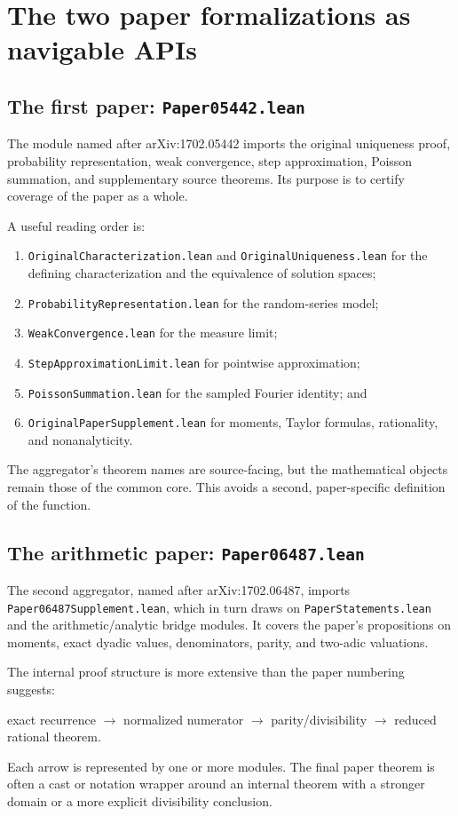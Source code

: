 \documentclass[11pt,oneside]{article}
\theoremstyle{definition}
\theoremstyle{remark}
\begin{document}
\section{The two paper formalizations as navigable APIs}\label{ch:papers}

\subsection{The first paper: \texttt{Paper05442.lean}}
The module named after arXiv:1702.05442 imports the original uniqueness proof, probability representation, weak convergence, step approximation, Poisson summation, and supplementary source theorems.  Its purpose is to certify coverage of the paper as a whole.

A useful reading order is:
\begin{enumerate}
  \item \nolinkurl{OriginalCharacterization.lean} and \nolinkurl{OriginalUniqueness.lean}
    for the defining characterization and the equivalence of solution spaces;
  \item \nolinkurl{ProbabilityRepresentation.lean} for the random-series model;
  \item \nolinkurl{WeakConvergence.lean} for the measure limit;
  \item \nolinkurl{StepApproximationLimit.lean} for pointwise approximation;
  \item \nolinkurl{PoissonSummation.lean} for the sampled Fourier identity; and
  \item \nolinkurl{OriginalPaperSupplement.lean} for moments, Taylor formulas, rationality, and nonanalyticity.
\end{enumerate}

The aggregator's theorem names are source-facing, but the mathematical objects remain those of the common core.  This avoids a second, paper-specific definition of the function.

\subsection{The arithmetic paper: \texttt{Paper06487.lean}}
The second aggregator, named after arXiv:1702.06487, imports \nolinkurl{Paper06487Supplement.lean}, which in turn draws on \nolinkurl{PaperStatements.lean} and the arithmetic/analytic bridge modules.  It covers the paper's propositions on moments, exact dyadic values, denominators, parity, and two-adic valuations.

The internal proof structure is more extensive than the paper numbering suggests:
\begin{center}
exact recurrence \(\longrightarrow\) normalized numerator \(\longrightarrow\)
parity/divisibility \(\longrightarrow\) reduced rational theorem.
\end{center}
Each arrow is represented by one or more modules.  The final paper theorem is often a cast or notation wrapper around an internal theorem with a stronger domain or a more explicit divisibility conclusion.
\end{document}
